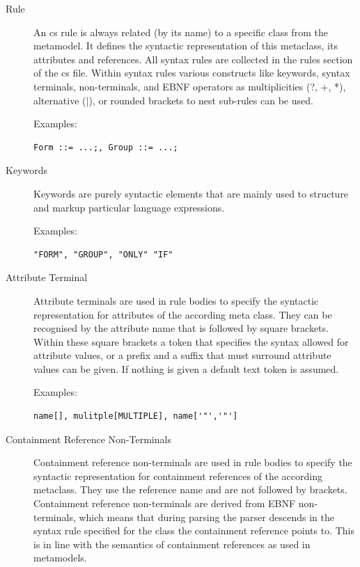 	\begin{description}
       \item[Rule] An cs rule is always related (by its name) to a specific
		class from the metamodel. It defines the syntactic representation of this
		metaclass, its attributes and references. All syntax rules are collected in
		the rules section of the cs file. Within syntax rules various constructs like
		keywords, syntax terminals, non-terminals, and EBNF operators as
		multiplicities (?, +, *), alternative (|), or rounded brackets 
		to nest sub-rules can be used.
		
		Examples: \begin{verbatim}Form ::= ...;, Group ::= ...;\end{verbatim}
        
       \item[Keywords] Keywords are purely syntactic elements that are mainly
        used to structure and markup particular language expressions.
        
        Examples: \begin{verbatim}"FORM", "GROUP", "ONLY" "IF" \end{verbatim}
        
        
       \item[Attribute Terminal] Attribute terminals are used in rule bodies to
        specify the syntactic representation for attributes of the according
        meta class. They can be recognised by the attribute name that is followed
        by square brackets. Within these square brackets a token that specifies
        the syntax allowed for attribute values, or a prefix and a suffix that
        must surround attribute values can be given. If nothing is given a
        default text token is assumed.

        Examples: \begin{verbatim}name[], mulitple[MULTIPLE], name['"','"']\end{verbatim}


       \item[Containment Reference Non-Terminals] Containment reference non-terminals
       are used in rule bodies to specify the syntactic representation for
       containment references of the according metaclass. They use the
       reference name and are not followed by brackets. Containment reference non-terminals
        are derived from
       EBNF non-terminals, which means that during parsing the parser descends
       in the syntax rule specified for the class the
       containment reference points to. This is in line with the semantics of
       containment references as used in metamodels. 


\end{description}
